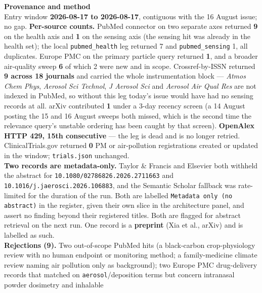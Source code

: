 \documentclass[10pt]{article}
\begin{document}


\vspace{4mm}
\begin{keybox}
{\sffamily\bfseries\footnotesize\color{Deep}Provenance and method}\\[1.2mm]
{\fontsize{7.2}{8.8}\selectfont
Entry window \textbf{2026-08-17 to 2026-08-17}, contiguous with the 16 August issue; no gap.
\textbf{Per-source counts.} PubMed connector on two separate axes returned \textbf{9} on the
health axis and \textbf{1} on the sensing axis (the sensing hit was already in the health
set); the local \texttt{pubmed\_health} leg returned 7 and \texttt{pubmed\_sensing} 1, all
duplicates. Europe PMC on the primary particle query returned \textbf{1}, and a broader
air-quality sweep \textbf{6} of which 2 were new and in scope. Crossref-by-ISSN returned
\textbf{9 across 18 journals} and carried the whole instrumentation block --- \textit{Atmos
Chem Phys}, \textit{Aerosol Sci Technol}, \textit{J Aerosol Sci} and \textit{Aerosol Air
Qual Res} are not indexed in PubMed, so without this leg today's issue would have had no
sensing records at all. arXiv contributed \textbf{1} under a 3-day recency screen (a 14
August posting the 15 and 16 August sweeps both missed, which is the second time the
relevance query's unstable ordering has been caught by that screen).
\textbf{OpenAlex HTTP 429, 15th consecutive} --- the leg is dead and is no longer retried.
ClinicalTrials.gov returned \textbf{0} PM or air-pollution registrations created or updated
in the window; \texttt{trials.json} unchanged.\\[0.8mm]
\textbf{Two records are metadata-only.} Taylor \& Francis and Elsevier both withheld the
abstract for \texttt{10.1080/02786826.2026.2711663} and
\texttt{10.1016/j.jaerosci.2026.106883}, and the Semantic Scholar fallback was rate-limited
for the duration of the run. Both are labelled \texttt{Metadata only (no abstract)} in the
register, given their own slice in the architecture panel, and assert no finding beyond
their registered titles. Both are flagged for abstract retrieval on the next run. One record
is a \textbf{preprint} (Xia et al., arXiv) and is labelled as such.\\[0.8mm]
\textbf{Rejections (9).} Two out-of-scope PubMed hits (a black-carbon crop-physiology review
with no human endpoint or monitoring method; a family-medicine climate review naming air
pollution only as background); two Europe PMC drug-delivery records that matched on
\texttt{aerosol}/deposition terms but concern intranasal powder dosimetry and inhalable
}
\end{keybox}
\end{document}
